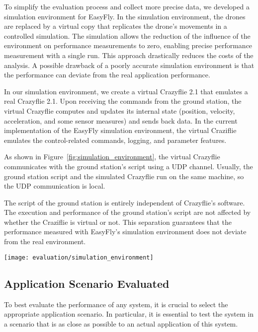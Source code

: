 To simplify the evaluation process and collect more precise data, we developed a simulation environment for EasyFly.
In the simulation environment, the drones are replaced by a virtual copy that replicates the drone's movements in a controlled simulation.
The simulation allows the reduction of the influence of the environment on performance measurements to zero, enabling precise performance measurement with a single run.
This approach drastically reduces the costs of the analysis.
A possible drawback of a poorly accurate simulation environment is that the performance can deviate from the real application performance.

In our simulation environment, we create a virtual Crazyflie 2.1 that emulates a real Crazyflie 2.1.
Upon receiving the commands from the ground station, the virtual Crazyflie computes and updates its internal state (position, velocity, acceleration, and some sensor measures) and sends back data.
In the current implementation of the EasyFly simulation environment, the virtual Craziflie emulates the control-related commands, logging, and parameter features.

As shown in Figure~\ref{fig:simulation_environment}, the virtual Crazyflie communicates with the ground station's script using a UDP channel.
Usually, the ground station script and the simulated Crazyflie run on the same machine, so the UDP communication is local.

The script of the ground station is entirely independent of Crazyflie's software. 
The execution and performance of the ground station's script are not affected by whether the Craziflie is virtual or not.
This separation guarantees that the performance measured with EasyFly's simulation environment does not deviate from the real environment.

\begin{SCfigure}[\sidecaptionrelwidth][h]
    \texttt{[image: evaluation/simulation\_environment]}
    \caption{Structure of EasyFly simulation environment.}\label{fig:simulation_environment}
\end{SCfigure}


\subsection{Application Scenario Evaluated}\label{subsec:application_scenario_evaluated}
To best evaluate the performance of any system, it is crucial to select the appropriate application scenario.
In particular, it is essential to test the system in a scenario that is as close as possible to an actual application of this system.


